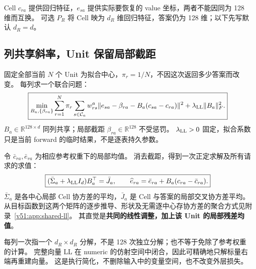 \documentclass[11pt,UTF8,fontset=fandol]{ctexart}
\numberwithin{equation}{section}
\theoremstyle{definition}
\newcommand{\R}{\mathbb R}
\begin{document}
Cell $c_{ra}$ 提供回归特征，$e_{sa}$ 提供实际要恢复的 value 坐标，两者不能因同为 128 维而互换。
可选 $P_R$ 将 Cell 映为 $d_R$ 维回归特征，答案仍为 128 维；以下先写默认 $d_R=d$。

\subsection{列共享斜率，Unit 保留局部截距}
\label{v51:sec:ll-main}
固定全部当前 $N$ 个 Unit 为拟合中心，$\pi_r=1/N$，不因这次返回多少答案而改变。
每列求一个联合问题：
\begin{equation}
 \boxed{\min_{B_a,\{\beta_{ra}\}}
 \sum_{r=1}^{N}\pi_r\sum_{s\in\mathcal C_a}w_{rs}^a
 \|e_{sa}-\beta_{ra}-B_a(c_{sa}-c_{ra})\|^2
 +\lambda_{\rm LL}\|B_a\|_F^2.}
 \label{front:eq:cell-ll}
\end{equation}
$B_a\in\R^{128\times d}$ 同列共享；局部截距 $\beta_{ra}\in\R^{128}$ 不受惩罚。
$\lambda_{\rm LL}>0$ 固定，拟合系数只是当前 forward 的临时结果，不是逐表持久参数。

令 $\bar c_{ra},\bar e_{ra}$ 为相应参考权重下的局部均值。
消去截距，得到一次正定求解及所有请求的求值：
\begin{equation}
 \boxed{(\bar\Sigma_a+\lambda_{\rm LL}I_d)B_a^\top=\bar J_a,\qquad
 \widehat e_{ra}=\bar e_{ra}+B_a(c_{ra}-\bar c_{ra}).}
 \label{v51:eq:shared-solve-main}
\end{equation}
$\bar\Sigma_a$ 是各中心局部 Cell 协方差的平均，$\bar J_a$ 是 Cell 与答案的局部交叉协方差平均。
从目标函数到这两个矩阵的逐步推导、形状及无需逐中心存协方差的聚合方式见附录~\ref{v51:app:shared-ll}。
其直觉是\textbf{共同的线性调整，加上该 Unit 的局部残差均值}。

每列一次指一个 $d_R\times d_R$ 分解，不是 128 次独立分解；也不等于免除了参考权重的计算。
完整向量 LL 在 numeric 的仿射空间中闭合，因此可精确地只解标量右端再重建向量。
这是执行简化，不删除输入中的变量空间，也不改变外层损失。
\end{document}
